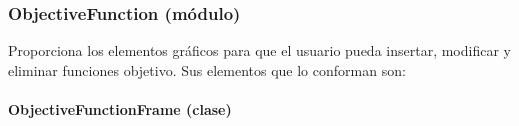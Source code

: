 \documentclass[class=report, crop=false]{standalone}
\begin{document}
\subsubsection{ObjectiveFunction (módulo)}
\label{sec:a_3_2_3}
Proporciona los elementos gráficos para que el usuario
pueda insertar, modificar y eliminar funciones objetivo.\medskip\break
Sus elementos que lo conforman son:

\paragraph{ObjectiveFunctionFrame (clase)}
\label{sec:a_3_2_3_1}
\end{document}
